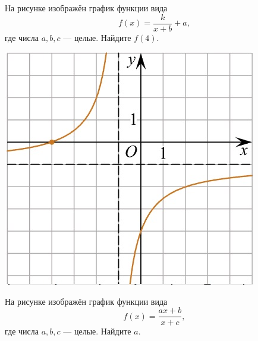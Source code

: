 \begin{class}[number=5]
\begin{listofex}
\begin{minipage}[t]{\picwidth}
		\end{minipage}
		\item
		\begin{minipage}[t]{\bodywidth}
			На рисунке изображён график функции вида \[ f(x)=\dfrac{k}{x+b}+a, \] где числа \(a, b, c\) --- целые. Найдите \(f(4)\).
		\end{minipage}
		\hspace{0.05\linewidth}
		\begin{minipage}[t]{\picwidth}
			\includegraphics[align=t, width=\linewidth]{pics/G101M4C5-3.jpg}
		\end{minipage}
		\item
		\begin{minipage}[t]{\bodywidth}
			На рисунке изображён график функции вида \[ f(x)=\dfrac{ax+b}{x+c}, \] где числа \(a, b, c\) --- целые. Найдите \(a\).
		\end{minipage}
		\hspace{0.05\linewidth}
		\begin{minipage}[t]{\picwidth}

\end{minipage}
\end{listofex}
\end{class}
